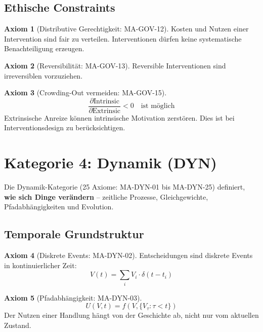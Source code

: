 \documentclass[11pt,a4paper]{article}
\theoremstyle{definition}
\newtheorem{axiom}{Axiom}[section]
\theoremstyle{plain}
\begin{document}
\subsection{Ethische Constraints}

\begin{axiom}[Distributive Gerechtigkeit: MA-GOV-12]
Kosten und Nutzen einer Intervention sind fair zu verteilen. Interventionen dürfen keine systematische Benachteiligung erzeugen.
\end{axiom}

\begin{axiom}[Reversibilität: MA-GOV-13]
Reversible Interventionen sind irreversiblen vorzuziehen.
\end{axiom}

\begin{axiom}[Crowding-Out vermeiden: MA-GOV-15]
\begin{equation}
\frac{\partial \text{Intrinsic}}{\partial \text{Extrinsic}} < 0 \quad \text{ist möglich}
\end{equation}
Extrinsische Anreize können intrinsische Motivation zerstören. Dies ist bei Interventionsdesign zu berücksichtigen.
\end{axiom}

\section{Kategorie 4: Dynamik (DYN)}

Die Dynamik-Kategorie (25 Axiome: MA-DYN-01 bis MA-DYN-25) definiert, \textbf{wie sich Dinge verändern} -- zeitliche Prozesse, Gleichgewichte, Pfadabhängigkeiten und Evolution.

\subsection{Temporale Grundstruktur}

\begin{axiom}[Diskrete Events: MA-DYN-02]
Entscheidungen sind diskrete Events in kontinuierlicher Zeit:
\begin{equation}
V(t) = \sum_i V_i \cdot \delta(t - t_i)
\end{equation}
\end{axiom}

\begin{axiom}[Pfadabhängigkeit: MA-DYN-03]
\begin{equation}
U(V, t) = f(V, \{V_\tau : \tau < t\})
\end{equation}
Der Nutzen einer Handlung hängt von der Geschichte ab, nicht nur vom aktuellen Zustand.
\end{axiom}
\end{document}
